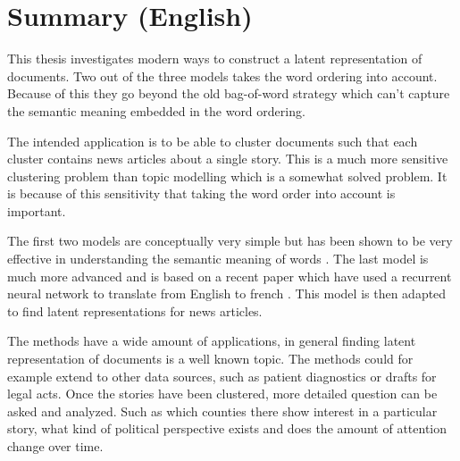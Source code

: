 \chapter{Summary (English)}

This thesis investigates modern ways to construct a latent representation of documents. Two out of the three models takes the word ordering into account. Because of this they go beyond the old bag-of-word strategy which can't capture the semantic meaning embedded in the word ordering. 

The intended application is to be able to cluster documents such that each cluster contains news articles about a single story. This is a much more sensitive clustering problem than topic modelling which is a somewhat solved problem. It is because of this sensitivity that taking the word order into account is important.

The first two models are conceptually very simple but has been shown to be very effective in understanding the semantic meaning of words \cite{word2vec-details, doc2vec}. The last model is much more advanced and is based on a recent paper which have used a recurrent neural network to translate from English to french \cite{sutskever}. This model is then adapted to find latent representations for news articles.

The methods have a wide amount of applications, in general finding latent representation of documents is a well known topic. The methods could for example extend to other data sources, such as patient diagnostics or drafts for legal acts.
Once the stories have been clustered, more detailed question can be asked and analyzed. Such as which counties there show interest in a particular story, what kind of political perspective exists and does the amount of attention change over time.
